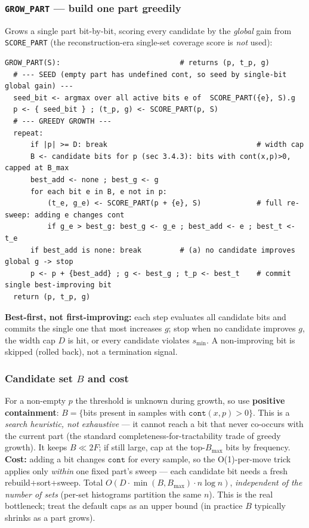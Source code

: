 \documentclass[11pt]{article}
\newcommand{\code}[1]{\texttt{#1}}
\newcommand{\cont}{\code{cont}}
\begin{document}
\subsubsection{\texorpdfstring{\code{GROW\_PART}}{GROW\_PART} --- build one part greedily}
Grows a single part bit-by-bit, scoring every candidate by the \emph{global} gain from \code{SCORE\_PART} (the reconstruction-era single-set coverage score is \emph{not} used):
\begin{lstlisting}
GROW_PART(S):                            # returns (p, t_p, g)
  # --- SEED (empty part has undefined cont, so seed by single-bit global gain) ---
  seed_bit <- argmax over all active bits e of  SCORE_PART({e}, S).g
  p <- { seed_bit } ; (t_p, g) <- SCORE_PART(p, S)
  # --- GREEDY GROWTH ---
  repeat:
      if |p| >= D: break                                   # width cap
      B <- candidate bits for p (sec 3.4.3): bits with cont(x,p)>0, capped at B_max
      best_add <- none ; best_g <- g
      for each bit e in B, e not in p:
          (t_e, g_e) <- SCORE_PART(p + {e}, S)             # full re-sweep: adding e changes cont
          if g_e > best_g: best_g <- g_e ; best_add <- e ; best_t <- t_e
      if best_add is none: break         # (a) no candidate improves global g -> stop
      p <- p + {best_add} ; g <- best_g ; t_p <- best_t    # commit single best-improving bit
  return (p, t_p, g)
\end{lstlisting}
\textbf{Best-first, not first-improving:} each step evaluates all candidate bits and commits the single one that most increases $g$; stop when no candidate improves $g$, the width cap $D$ is hit, or every candidate violates $s_{\min}$. A non-improving bit is skipped (rolled back), not a termination signal.

\subsubsection{Candidate set \texorpdfstring{$B$}{B} and cost}
For a non-empty $p$ the threshold is unknown during growth, so use \textbf{positive containment}: $B=\{$bits present in samples with $\cont(x,p)>0\}$. This is a \emph{search heuristic, not exhaustive} --- it cannot reach a bit that never co-occurs with the current part (the standard completeness-for-tractability trade of greedy growth). It keeps $B\ll 2F$; if still large, cap at the top-$B_{\max}$ bits by frequency. \textbf{Cost:} adding a bit changes $\cont$ for every sample, so the O(1)-per-move trick applies only \emph{within} one fixed part's sweep --- each candidate bit needs a fresh rebuild+sort+sweep. Total $O(D\cdot\min(B,B_{\max})\cdot n\log n)$, \emph{independent of the number of sets} (per-set histograms partition the same $n$). This is the real bottleneck; treat the default caps as an upper bound (in practice $B$ typically shrinks as a part grows).
\end{document}
